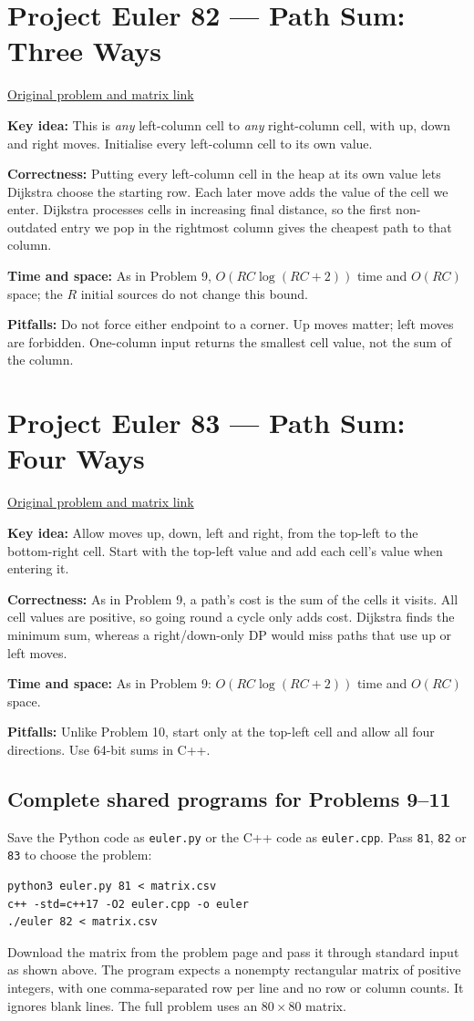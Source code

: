 \documentclass[11pt]{article}
\newcommand{\insight}[1]{\par\medskip\noindent\textbf{Key idea:} #1}
\newcommand{\correct}[1]{\par\textbf{Correctness:} #1}
\newcommand{\bounds}[1]{\par\textbf{Time and space:} #1}
\newcommand{\pitfalls}[1]{\par\textbf{Pitfalls:} #1}
\begin{document}
\section{Project Euler 82 --- Path Sum: Three Ways}
\href{https://projecteuler.net/problem=82}{Original problem and matrix link}
\insight{This is \emph{any} left-column cell to \emph{any} right-column cell, with up, down and right moves. Initialise every left-column cell to its own value.}
\correct{Putting every left-column cell in the heap at its own value lets Dijkstra choose the starting row. Each later move adds the value of the cell we enter. Dijkstra processes cells in increasing final distance, so the first non-outdated entry we pop in the rightmost column gives the cheapest path to that column.}
\bounds{As in Problem 9, $O(RC\log(RC+2))$ time and $O(RC)$ space; the $R$ initial sources do not change this bound.}
\pitfalls{Do not force either endpoint to a corner. Up moves matter; left moves are forbidden. One-column input returns the smallest cell value, not the sum of the column.}

\section{Project Euler 83 --- Path Sum: Four Ways}
\href{https://projecteuler.net/problem=83}{Original problem and matrix link}
\insight{Allow moves up, down, left and right, from the top-left to the bottom-right cell. Start with the top-left value and add each cell's value when entering it.}
\correct{As in Problem 9, a path's cost is the sum of the cells it visits. All cell values are positive, so going round a cycle only adds cost. Dijkstra finds the minimum sum, whereas a right/down-only DP would miss paths that use up or left moves.}
\bounds{As in Problem 9: $O(RC\log(RC+2))$ time and $O(RC)$ space.}
\pitfalls{Unlike Problem 10, start only at the top-left cell and allow all four directions. Use 64-bit sums in C++.}

\subsection*{Complete shared programs for Problems 9--11}
Save the Python code as \texttt{euler.py} or the C++ code as \texttt{euler.cpp}. Pass \texttt{81}, \texttt{82} or \texttt{83} to choose the problem:
\begin{verbatim}
python3 euler.py 81 < matrix.csv
c++ -std=c++17 -O2 euler.cpp -o euler
./euler 82 < matrix.csv
\end{verbatim}
Download the matrix from the problem page and pass it through standard input as shown above. The program expects a nonempty rectangular matrix of positive integers, with one comma-separated row per line and no row or column counts. It ignores blank lines. The full problem uses an $80\times80$ matrix.
\end{document}
